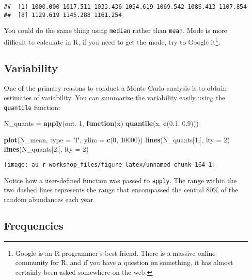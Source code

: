 \documentclass[]{book}
\newenvironment{Shaded}{\begin{snugshade}}{\end{snugshade}}
\newcommand{\KeywordTok}[1]{\textcolor[rgb]{0.13,0.29,0.53}{\textbf{#1}}}
\newcommand{\DataTypeTok}[1]{\textcolor[rgb]{0.13,0.29,0.53}{#1}}
\newcommand{\DecValTok}[1]{\textcolor[rgb]{0.00,0.00,0.81}{#1}}
\newcommand{\FloatTok}[1]{\textcolor[rgb]{0.00,0.00,0.81}{#1}}
\newcommand{\StringTok}[1]{\textcolor[rgb]{0.31,0.60,0.02}{#1}}
\newcommand{\ControlFlowTok}[1]{\textcolor[rgb]{0.13,0.29,0.53}{\textbf{#1}}}
\newcommand{\NormalTok}[1]{#1}
\let\rmarkdownfootnote\footnote%
\def\footnote{\protect\rmarkdownfootnote}
\theoremstyle{definition}
\theoremstyle{definition}
\theoremstyle{definition}
\theoremstyle{remark}
\begin{document}
\begin{verbatim}
##  [1] 1000.000 1017.511 1033.436 1054.619 1069.542 1086.413 1107.854
##  [8] 1129.619 1145.288 1161.254
\end{verbatim}

You could do the same thing using \texttt{median} rather than
\texttt{mean}. Mode is more difficult to calculate in R, if you need to
get the mode, try to Google it\footnote{Google is an R programmer's best
  friend. There is a massive online community for R, and if you have a
  question on something, it has almost certainly been asked somewhere on
  the web.}.

\subsection{Variability}\label{variability}

One of the primary reasons to conduct a Monte Carlo analysis is to
obtain estimates of variability. You can summarize the variability
easily using the \texttt{quantile} function:

\begin{Shaded}
\begin{Highlighting}[]
\NormalTok{N_quants =}\StringTok{ }\KeywordTok{apply}\NormalTok{(out, }\DecValTok{1}\NormalTok{, }\ControlFlowTok{function}\NormalTok{(x) }\KeywordTok{quantile}\NormalTok{(x, }\KeywordTok{c}\NormalTok{(}\FloatTok{0.1}\NormalTok{, }\FloatTok{0.9}\NormalTok{)))}

\KeywordTok{plot}\NormalTok{(N_mean, }\DataTypeTok{type =} \StringTok{"l"}\NormalTok{, }\DataTypeTok{ylim =} \KeywordTok{c}\NormalTok{(}\DecValTok{0}\NormalTok{, }\DecValTok{10000}\NormalTok{))}
\KeywordTok{lines}\NormalTok{(N_quants[}\DecValTok{1}\NormalTok{,], }\DataTypeTok{lty =} \DecValTok{2}\NormalTok{)}
\KeywordTok{lines}\NormalTok{(N_quants[}\DecValTok{2}\NormalTok{,], }\DataTypeTok{lty =} \DecValTok{2}\NormalTok{)}
\end{Highlighting}
\end{Shaded}

\begin{center}\texttt{[image: au-r-workshop\_files/figure-latex/unnamed-chunk-164-1]} \end{center}

Notice how a user-defined function was passed to \texttt{apply}. The
range within the two dashed lines represents the range that encompassed
the central 80\% of the random abundances each year.

\subsection{Frequencies}\label{frequencies}
\end{document}
